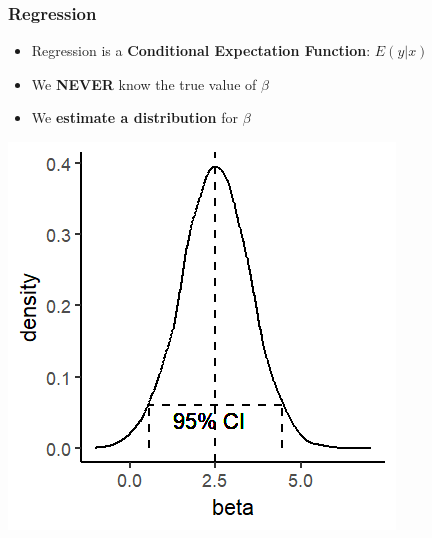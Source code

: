 \documentclass[xcolor=x11names,compress]{beamer}\usepackage[]{graphicx}\usepackage[]{color}
\makeatletter
\def\maxwidth{ %
  \ifdim\Gin@nat@width>\linewidth
    \linewidth
  \else
    \Gin@nat@width
  \fi
}
\newenvironment{knitrout}{}{} %
\renewcommand{\(}{\begin{columns}}
\renewcommand{\)}{\end{columns}}
\newcommand{\<}[1]{\begin{column}{#1}}
\renewcommand{\>}{\end{column}}
\makeatother
\begin{document}
\begin{frame}
\frametitle{Regression}
\begin{itemize}
\item Regression is a \textbf{Conditional Expectation Function}: $E(y|x)$
\item We \textbf{NEVER} know the true value of $\beta$
\item We \textbf{estimate a distribution} for $\beta$
\end{itemize}
\begin{knitrout}
\color{fgcolor}
\includegraphics[width=\maxwidth]{figure/beta_dist5-1} 

\end{knitrout}
\end{frame}
\end{document}
